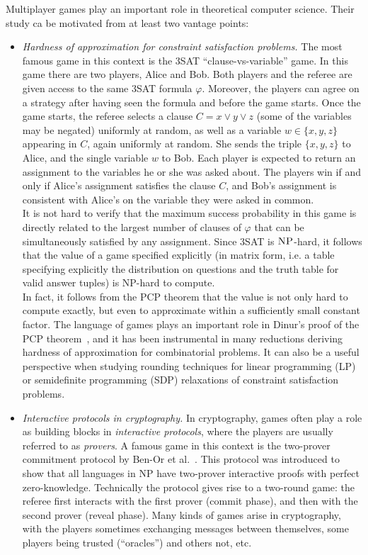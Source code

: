 \documentclass{book}
\theoremstyle{plain}
\theoremstyle{definition}
\theoremstyle{remark}
\numberwithin{equation}{subsection}
\newcommand{\NP}{\textsc{NP}}
\begin{document}
Multiplayer games play an important role in theoretical computer science. Their study ca be motivated from at least two vantage points: 
\begin{itemize}
\item \emph{Hardness of approximation for constraint satisfaction problems.} The most famous game in this context is the $3$SAT ``clause-vs-variable'' game. In this game there are two players, Alice and Bob. Both players and the referee are given access to the same $3$SAT formula $\varphi$. Moreover, the players can agree on a strategy after having seen the formula and before the game starts. Once the game starts, the referee selects a clause $C = x \vee y \vee z$ (some of the variables may be negated) uniformly at random, as well as a variable $w\in\{x,y,z\}$ appearing in $C$, again uniformly at random. She sends the triple $\{x,y,z\}$ to Alice, and the single variable $w$ to Bob. Each player is expected to return an assignment to the variables he or she was asked about. The players win if and only if Alice's assignment satisfies the clause $C$, and Bob's assignment is consistent with Alice's on the variable they were asked in common.\\
It is not hard to verify that the maximum success probability in this game is directly related to the largest number of clauses of $\varphi$ that can be simultaneously satisfied by any assignment. Since $3$SAT is $\NP$-hard, it follows that the value of a game specified explicitly (in matrix form, i.e. a table specifying explicitly the distribution on questions and the truth table for valid answer tuples) is NP-hard to compute. \\
In fact, it follows from the PCP theorem that the value is not only hard to compute exactly, but even to approximate within a sufficiently small constant factor. The language of games plays an important role in 
Dinur's proof of the PCP theorem~\cite{dinur2007pcp}, and it has been instrumental in many reductions deriving hardness of approximation for combinatorial problems. It can also be a useful perspective when studying rounding techniques for linear programming (LP) or semidefinite programming (SDP) relaxations of constraint satisfaction problems. 

\item \emph{Interactive protocols in cryptography.} In cryptography, games often play a role as building blocks in \emph{interactive protocols}, where the players are usually referred to as \emph{provers}. A famous game in this context is the two-prover commitment protocol by Ben-Or et al.~\cite{ben1988multi}. This protocol was introduced to show that all languages in NP have two-prover interactive proofs with perfect zero-knowledge. Technically the protocol gives rise to a two-round game: the referee first interacts with the first prover (commit phase), and then with the second prover (reveal phase). Many kinds of games arise in cryptography, with the players sometimes exchanging messages between themselves, some players being trusted (``oracles'') and others not, etc. 
\end{itemize}
\end{document}
